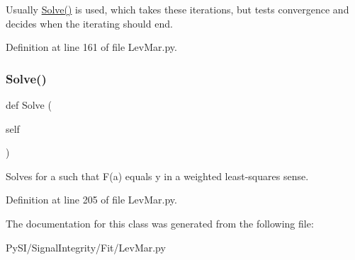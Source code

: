 Usually \hyperlink{classSignalIntegrity_1_1Fit_1_1LevMar_1_1LevMar_acfa2263d4f73bf98053a5a8ed10a4c41}{Solve()} is used, which takes these iterations, but tests convergence and decides when the iterating should end. 

Definition at line 161 of file Lev\+Mar.\+py.

\mbox{\label{classSignalIntegrity_1_1Fit_1_1LevMar_1_1LevMar_acfa2263d4f73bf98053a5a8ed10a4c41}} 
\subsubsection{\texorpdfstring{Solve()}{Solve()}}
{\footnotesize\ttfamily def Solve (\begin{DoxyParamCaption}\item[{}]{self }\end{DoxyParamCaption})}



Solves for a such that F(a) equals y in a weighted least-\/squares sense. 



Definition at line 205 of file Lev\+Mar.\+py.



The documentation for this class was generated from the following file\+:\begin{DoxyCompactItemize}
\item 
Py\+S\+I/\+Signal\+Integrity/\+Fit/Lev\+Mar.\+py\end{DoxyCompactItemize}
